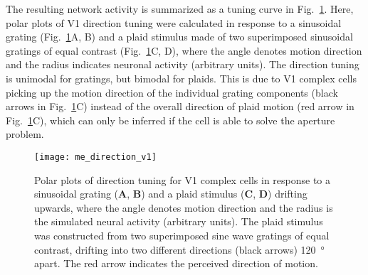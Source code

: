 The resulting network activity is summarized as a tuning curve in
Fig.~\ref{fig:ME|CUDA|V1}.
Here, polar plots of \ac{V1} direction tuning were calculated in response
to a sinusoidal grating (Fig.~\ref{fig:ME|CUDA|V1}A, B) and a plaid stimulus
made of two superimposed sinusoidal gratings of equal contrast
(Fig.~\ref{fig:ME|CUDA|V1}C, D), where the angle denotes motion direction and
the radius indicates neuronal activity (arbitrary units).
The direction tuning is unimodal for gratings, but bimodal for plaids.
This is due to \ac{V1} complex cells picking up the motion direction of the
individual grating components (black arrows in Fig.~\ref{fig:ME|CUDA|V1}C)
instead of the overall direction of plaid motion 
(red arrow in Fig.~\ref{fig:ME|CUDA|V1}C), which can only be inferred if the
cell is able to solve the aperture problem.

\begin{figure}[t]
  \centering
  \texttt{[image: me\_direction\_v1]}
  \caption{
  Polar plots of direction tuning for \ac{V1} complex cells in response to
  a sinusoidal grating
  (\textbf{A}, \textbf{B}) and a plaid stimulus 
  (\textbf{C}, \textbf{D}) drifting upwards, where the angle
  denotes motion direction and the radius is the simulated
  neural activity (arbitrary units).
  The plaid stimulus was constructed from two superimposed sine wave gratings
  of equal contrast, drifting into two different directions (black arrows)
  \SI{120}{\degree} apart. 
  The red arrow indicates the perceived direction of motion.
  }
  \label{fig:ME|CUDA|V1}
\end{figure}


